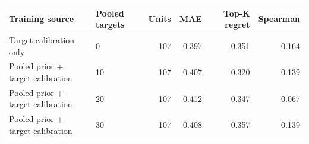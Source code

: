 \begin{tabular}{llrrrr}
\toprule
Training source & Pooled targets & Units & MAE & Top-K regret & Spearman \\
\midrule
Target calibration only & 0 & 107 & 0.397 & 0.351 & 0.164 \\
Pooled prior + target calibration & 10 & 107 & 0.407 & 0.320 & 0.139 \\
Pooled prior + target calibration & 20 & 107 & 0.412 & 0.347 & 0.067 \\
Pooled prior + target calibration & 30 & 107 & 0.408 & 0.357 & 0.139 \\
\bottomrule
\end{tabular}
